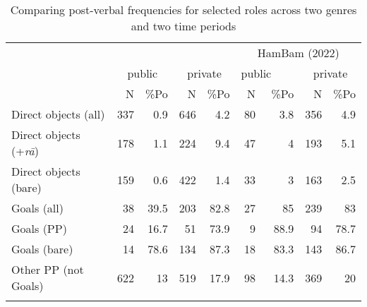 \documentclass[output=paper,colorlinks,citecolor=brown,draftmode]{langscibook}
\begin{document}
\begin{table}
 \begin{tabularx}{\textwidth}{X rrrr@{\qquad}rrrr}
\lsptoprule
& \multicolumn{4}{c}{\citet{frommer_post-verbal_1981}} & \multicolumn{4}{c}{HamBam (2022)} \\
\cmidrule(lr){2-5}\cmidrule(lr){6-9}
& \multicolumn{2}{c}{public} & \multicolumn{2}{c}{private} & \multicolumn{2}{r}{public~~~~} & \multicolumn{2}{c}{private} \\
\cmidrule(lr){2-3}\cmidrule(lr){4-5}\cmidrule(lr){6-7}\cmidrule(lr){8-9}
& N & \%Po & N & \%Po & N & \%Po  & N & \%Po  \\
\midrule
Direct objects (all) & 337 & 0.9\cellcolor{lightgray} & 646 & 4.2\cellcolor{lightgray} & 80 & 3.8 \cellcolor{lightgray}& 356 & 4.9\cellcolor{lightgray} \\
Direct objects (+\textit{rā}) & 178 & 1.1\cellcolor{lightgray} & 224 & 9.4\cellcolor{lightgray} & 47 & 4\cellcolor{lightgray} & 193 & 5.1\cellcolor{lightgray} \\
Direct objects (bare) & 159 & 0.6\cellcolor{lightgray} & 422 & 1.4\cellcolor{lightgray} & 33 & 3\cellcolor{lightgray} & 163 & 2.5\cellcolor{lightgray} \\
Goals (all) & 38 & 39.5\cellcolor{lightgray} & 203 & 82.8\cellcolor{lightgray} & 27 & 85\cellcolor{lightgray} & 239 & 83\cellcolor{lightgray} \\
Goals (PP) & 24 & 16.7\cellcolor{lightgray} & 51 & 73.9\cellcolor{lightgray} & 9 & 88.9\cellcolor{lightgray} & 94 & 78.7\cellcolor{lightgray} \\
Goals (bare) & 14 & 78.6\cellcolor{lightgray} & 134 & 87.3\cellcolor{lightgray} & 18 & 83.3\cellcolor{lightgray} & 143 & 86.7\cellcolor{lightgray} \\
Other PP (not Goals) & 622 & 13\cellcolor{lightgray} & 519 & 17.9\cellcolor{lightgray} & 98 & 14.3\cellcolor{lightgray} & 369 & 20\cellcolor{lightgray} \\
\lspbottomrule
 \end{tabularx}
 \caption{Comparing post-verbal frequencies for selected roles across two genres and two time periods}
 \label{Persian:tab:17}
\end{table}
\end{document}
